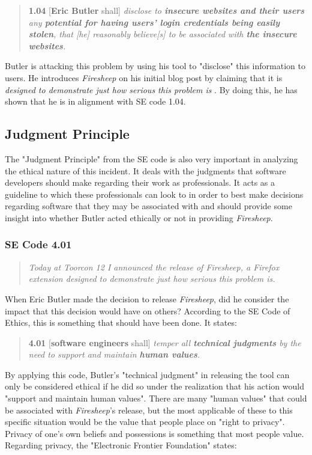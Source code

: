 \documentclass[11pt]{article}
\begin{document}
\begin{multicols}{2}
\begin{quote}
  \textbf{1.04} [\textbf{Eric Butler} shall] \emph{disclose to \textbf{insecure websites and their users} any \textbf{potential for having users' login credentials being easily stolen}, that [he] reasonably believe[s] to be associated with \textbf{the insecure websites}.}
\end{quote}

Butler is attacking this problem by using his tool to "disclose" this information to users. He introduces \emph{Firesheep} on his initial blog post by claiming that it is \emph{designed to demonstrate just how serious this problem is} \cite{codebutler_main}. By doing this, he has shown that he is in alignment with SE code 1.04.

\subsection{Judgment Principle}
The "Judgment Principle" from the SE code is also very important in analyzing the ethical nature of this incident. It deals with the judgments that software developers should make regarding their work as professionals. It acts as a guideline to which these professionals can look to in order to best make decisions regarding software that they may be associated with and should provide some insight into whether Butler acted ethically or not in providing \emph{Firesheep}.

\subsubsection{SE Code 4.01}
\begin{quote}
  \emph{Today at Toorcon 12 I announced the release of Firesheep, a Firefox extension designed to demonstrate just how serious this problem is.} \cite{codebutler_main}
\end{quote}

When Eric Butler made the decision to release \emph{Firesheep}, did he consider the impact that this decision would have on others? According to the SE Code of Ethics, this is something that should have been done. It states:


\begin{quote}
\textbf{4.01} [\textbf{software engineers} shall] \emph{temper all \textbf{technical judgments} by the need to support and maintain \textbf{human values}.} \cite{se_code}
\end{quote}

By applying this code, Butler's "technical judgment" in releasing the tool can only be considered ethical if he did so under the realization that his action would "support and maintain human values". There are many "human values" that could be associated with \emph{Firesheep}'s release, but the most applicable of these to this specific situation would be the value that people place on "right to privacy". Privacy of one's own beliefs and possessions is something that most people value. Regarding privacy, the "Electronic Frontier Foundation" states:


\end{multicols}
\end{document}
